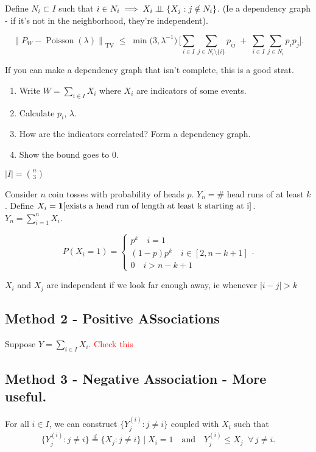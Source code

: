 \documentclass{article}
\newcommand\myworries[1]{\textcolor{red}{#1}}
\begin{document}
Define $N_i \subset I$ such that $i \in N_{i} \implies X_i \perp \! \! \! \perp \{X_j: j\notin N_{i} \} $. (Ie a dependency graph - if it's not in the neighborhood, they're independent). 

\[
\left\|P_{W}-\operatorname{Poisson}(\lambda)\right\|_{\mathrm{TV}}
\;\le\;
\min\!\bigl(3,\lambda^{-1}\bigr)\,
\biggl[
   \sum_{i\in I}\sum_{j\in N_i\setminus\{i\}} p_{ij}
   \;+\;
   \sum_{i\in I}\sum_{j\in N_i} p_i p_j
\biggr].
\]

\begin{recipe}
If you can make a dependency graph that isn't complete, this is a good strat. 
\begin{enumerate}
	\item Write $W = \sum_{i\in I} X_i$ where $X_i$ are indicators of some events. 
	\item Calculate $p_i$, $\lambda$.
	\item How are the indicators correlated? Form a dependency graph. 
	\item Show the bound goes to $0$. 
\end{enumerate}
\end{recipe}

\begin{example}
$|I| = \binom{n}{3}$
\end{example}
\begin{example}
Consider $n$ coin tosses with probability of heads $p$. $Y_n = \#$ head runs of at least $k$. Define $X_i = \boldsymbol{1}[ \text{exists a head run of length at least k starting at i}]$. $Y_n = \sum_{i=1}^n X_i $. 

$$P(X_i = 1) = \begin{cases}
	p^k \quad i = 1\\
	(1-p)p^k \quad i\in [2, n-k +1]\\
	0 \quad i> n-k+1 
\end{cases}.$$

$X_i$ and $X_j$ are independent if we look far enough away, ie whenever $|i - j| > k$ 

\end{example}


\subsection{Method 2 - Positive ASsociations}
Suppose $Y = \sum_{i\in I} X_i$. 
\myworries{Check this}

\subsection{Method 3 - Negative Association - More useful.}
For all $i \in I$, we can construct $\{Y^{(i)}_j : j \neq i\}$ coupled with $X_i$ such that
\[
  \{Y^{(i)}_j : j \neq i\} 
  \stackrel{d}{=}
  \{X_j : j \neq i\} \mid X_i = 1
  \quad\text{and}\quad
  Y^{(i)}_j \le X_j \;\; \forall\, j \neq i .
\]
\end{document}
